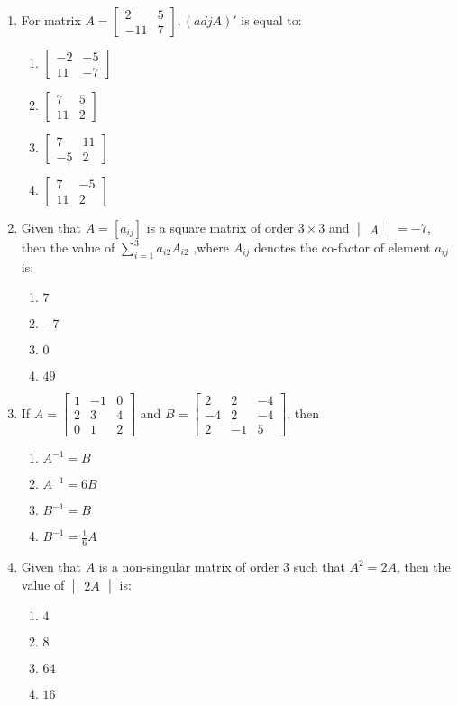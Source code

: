 \documentclass{article}
\providecommand{\mydet}[1]{\ensuremath{\begin{vmatrix}#1\end{vmatrix}}}
\providecommand{\myvec}[1]{\ensuremath{\begin{bmatrix}#1\end{bmatrix}}}
\begin{document}
\begin{enumerate}
    \item For matrix $A = \myvec{2 & 5 \\ -11 & 7}, (adj A)'$ is equal to:
    \begin{enumerate}
        \item $\myvec{-2 & -5 \\ 11 & -7}$
        \item $\myvec{7 & 5 \\ 11 & 2}$
        \item $\myvec{7 & 11 \\ -5 & 2}$
        \item $\myvec{7 & -5 \\ 11 & 2}$
    \end{enumerate}

    \item Given that $A = [a_{ij}]$ is a square matrix of order $3 \times 3$ and $\mydet{A} = -7$, then the value of  $\sum_{i=1}^{3} a_{i2}A_{i2}$ ,where $A_{ij}$ denotes the co-factor of element $a_{ij}$ is:

    \begin{enumerate}
        \item $7$
        \item $-7$
        \item $0$
        \item $49$
    \end{enumerate}

    \item If $A =\myvec{1 &-1 & 0 \\2&3 & 4 \\0&1&2}$ and $B = \myvec{2&2&-4\\-4&2&-4\\2&-1&5}$, then
    \begin{enumerate}
        \item $A^{-1} = B$
        \item $A^{-1} = 6B$
        \item $B^{-1} = B$
        \item $B^{-1} = \frac{1}{6} A$
    \end{enumerate}
    
    \item Given that $A$ is a non-singular matrix of order $3$ such that $A^2 = 2A$, then the value of $\mydet{2A}$ is:
    \begin{enumerate}
        \item $4$
        \item $8$
        \item $64$
        \item $16$
    \end{enumerate}


\end{enumerate}
\end{document}
